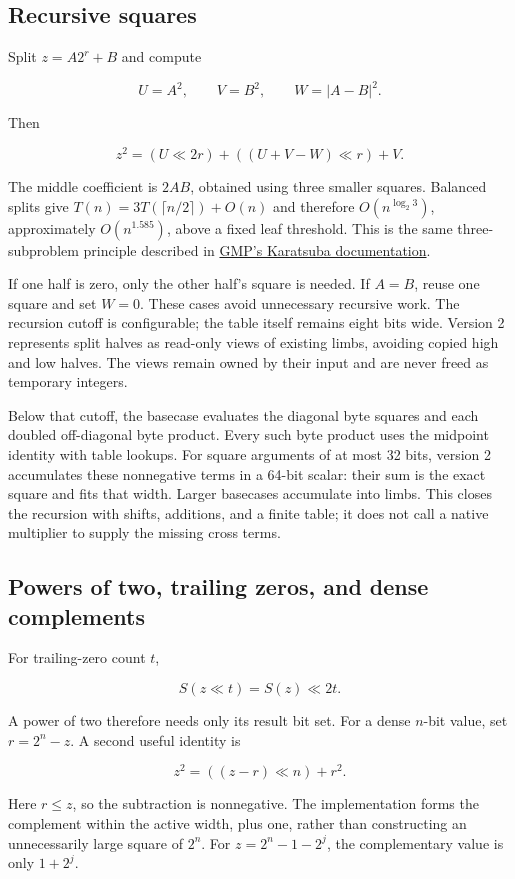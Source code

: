 \documentclass[11pt,a4paper]{article}
\begin{document}
\subsection{Recursive squares}

Split $z=A2^r+B$ and compute

\[
U=A^2,\qquad V=B^2,\qquad W=|A-B|^2.
\]

Then

\[
z^2=(U\ll2r)+((U+V-W)\ll r)+V.
\]

The middle coefficient is $2AB$, obtained using three smaller squares. Balanced splits give $T(n)=3T(\lceil n/2\rceil)+O(n)$ and therefore $O(n^{\log_2 3})$, approximately $O(n^{1.585})$, above a fixed leaf threshold. This is the same three-subproblem principle described in \href{\detokenize{https://gmplib.org/manual/Karatsuba-Multiplication}}{GMP's Karatsuba documentation}.

If one half is zero, only the other half's square is needed. If $A=B$, reuse one square and set $W=0$. These cases avoid unnecessary recursive work. The recursion cutoff is configurable; the table itself remains eight bits wide. Version 2 represents split halves as read-only views of existing limbs, avoiding copied high and low halves. The views remain owned by their input and are never freed as temporary integers.

Below that cutoff, the basecase evaluates the diagonal byte squares and each doubled off-diagonal byte product. Every such byte product uses the midpoint identity with table lookups. For square arguments of at most 32 bits, version 2 accumulates these nonnegative terms in a 64-bit scalar: their sum is the exact square and fits that width. Larger basecases accumulate into limbs. This closes the recursion with shifts, additions, and a finite table; it does not call a native multiplier to supply the missing cross terms.

\subsection{Powers of two, trailing zeros, and dense complements}

For trailing-zero count $t$,

\[
S(z\ll t)=S(z)\ll2t.
\]

A power of two therefore needs only its result bit set. For a dense $n$-bit value, set $r=2^n-z$. A second useful identity is

\[
z^2=((z-r)\ll n)+r^2.
\]

Here $r\le z$, so the subtraction is nonnegative. The implementation forms the complement within the active width, plus one, rather than constructing an unnecessarily large square of $2^n$. For $z=2^n-1-2^j$, the complementary value is only $1+2^j$.
\end{document}

